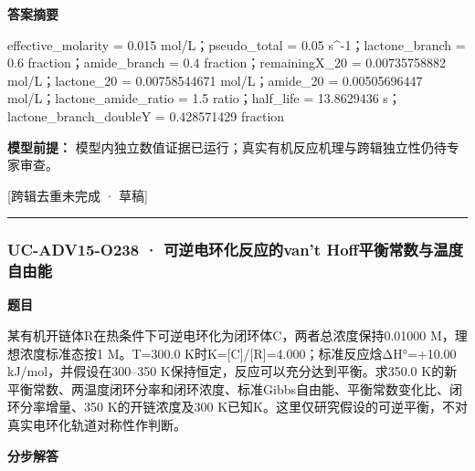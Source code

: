 \documentclass[UTF8,11pt,a4paper]{ctexart}
\begin{document}
\noindent\textbf{答案摘要}\par
effective\_molarity = 0.015 mol/L；pseudo\_total = 0.05 s\textasciicircum{}-1；lactone\_branch = 0.6 fraction；amide\_branch = 0.4 fraction；remainingX\_20 = 0.00735758882 mol/L；lactone\_20 = 0.00758544671 mol/L；amide\_20 = 0.00505696447 mol/L；lactone\_amide\_ratio = 1.5 ratio；half\_life = 13.8629436 s；lactone\_branch\_doubleY = 0.428571429 fraction\par
\noindent\textbf{模型前提：}
模型内独立数值证据已运行；真实有机反应机理与跨辑独立性仍待专家审查。\par
\noindent\textcolor{red!65!black}{[跨辑去重未完成 · 草稿]} \par
\medskip\hrule\medskip
{}
\subsubsection*{UC-ADV15-O238 · 可逆电环化反应的van’t Hoff平衡常数与温度自由能}
\noindent\textbf{题目}\par
某有机开链体R在热条件下可逆电环化为闭环体C，两者总浓度保持0.01000 M，理想浓度标准态按1 M。T=300.0 K时K=[C]/[R]=4.000；标准反应焓ΔH°=+10.00 kJ/mol，并假设在300–350 K保持恒定，反应可以充分达到平衡。求350.0 K的新平衡常数、两温度闭环分率和闭环浓度、标准Gibbs自由能、平衡常数变化比、闭环分率增量、350 K的开链浓度及300 K已知K。这里仅研究假设的可逆平衡，不对真实电环化轨道对称性作判断。\par
\medskip\noindent\textbf{分步解答}
\end{document}
